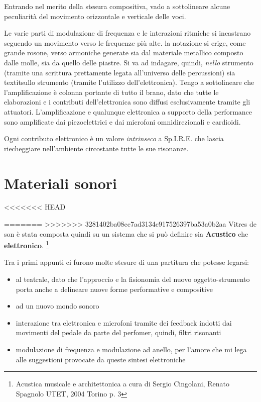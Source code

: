 Entrando nel merito della stesura compositiva, vado a sottolineare alcune peculiarità del movimento orizzontale e verticale delle voci.

Le varie parti di modulazione di frequenza e le interazioni ritmiche si incastrano seguendo un movimento verso le frequenze più alte.  la notazione si erige, come grande rosone, verso armoniche generate sia dal materiale metallico composto dalle molle, sia da quello delle piastre. Si va ad indagare, quindi, \textit{nello} strumento (tramite una scrittura prettamente legata all'universo delle percussioni) sia textit{sullo} strumento (tramite l'utilizzo dell'elettronica). Tengo a sottolineare che l'amplificazione è colonna portante di tutto il brano, dato che tutte le elaborazioni e i contributi dell'elettronica sono diffusi esclusivamente tramite gli attuatori. L'amplificazione e qualunque elettronica a supporto della performance sono amplificate dai piezoelettrici e dai microfoni omnidirezionali e cardioidi.

Ogni contributo elettronico è un valore \textit{intrinseco} a Sp.I.R.E. che lascia riecheggiare nell'ambiente circostante tutte le sue risonanze.

\section{Materiali sonori}
<<<<<<< HEAD

=======
>>>>>>> 3281402ba08cc7ad3134c917526397ba53a0b2aa
Vitres de son è stata composta quindi su un sistema che si può definire sia \textbf{Acustico} che \textbf{elettronico}. \footnote{Acustica musicale e architettonica a cura di Sergio Cingolani, Renato Spagnolo UTET, 2004 Torino p. 3}

Tra i primi appunti ci furono molte stesure di una partitura che potesse legarsi:

\begin{itemize}
\item{al teatrale, dato che l'approccio e la fisionomia del nuovo oggetto-strumento porta anche a delineare nuove forme performative e compositive}
\item{ad un nuovo mondo sonoro}
\item{interazione tra elettronica e microfoni tramite dei feedback indotti dai movimenti del pedale da parte del perfomer, quindi, filtri risonanti}
\item{modulazione di frequenza e modulazione ad anello, per l'amore che mi lega alle suggestioni provocate da queste sintesi elettroniche}
\end{itemize}

